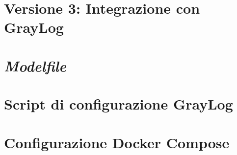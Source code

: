 \documentclass[12pt]{report}
\begin{document}


\clearpage

\section{Versione 3: Integrazione con GrayLog}



\clearpage

\section{\textit{Modelfile}}
\label{sec:code_modelfile}



\clearpage

\section{Script di configurazione GrayLog}
\label{sec:code_graylog_script}



\clearpage

\section{Configurazione Docker Compose}
\label{sec:code_container_config}




%
%

\beforebibliography




\end{document}
